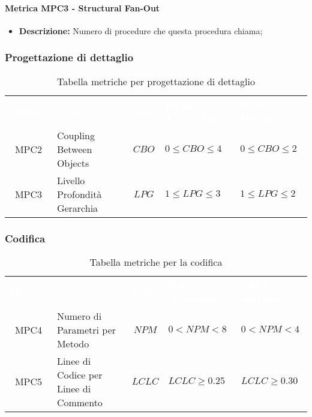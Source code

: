 \paragraph{Metrica MPC3 - Structural Fan-Out}
\begin{itemize}
	\item \textbf{Descrizione:} Numero di procedure che questa procedura chiama;
\end{itemize}
\vspace{0.3cm}
\subsubsection{Progettazione di dettaglio}
\renewcommand{\arraystretch}{1.5}
\begin{longtable}{ c C{4cm} c C{3.5cm} C{3.5cm}}
	\caption{Tabella metriche per progettazione di dettaglio}\\
	\textcolor{white}{\textbf{Metrica}} & \textcolor{white}{\textbf{Nome}} & \textcolor{white}{\textbf{Sigla}} & \textcolor{white}{\textbf{Range Accettabile}} & \textcolor{white}{\textbf{Range Ottimale}}\\
    MPC2 & Coupling Between Objects & $CBO$ & $0 \leq CBO \leq 4$ & $0 \leq CBO \leq 2$ \\
    MPC3 & Livello Profondità Gerarchia & $LPG$ &  $1 \leq LPG \leq 3$ &  $1 \leq LPG \leq 2$ \\
\end{longtable}
\newpage
\subsubsection{Codifica}  
     \renewcommand{\arraystretch}{1.5}
     \begin{longtable}{ c C{4cm} c C{3.5cm} C{3.5cm}}
     	\caption{Tabella metriche per la codifica}\\
     	\textcolor{white}{\textbf{Metrica}} & \textcolor{white}{\textbf{Nome}} & \textcolor{white}{\textbf{Sigla}} & \textcolor{white}{\textbf{Range Accettabile}} & \textcolor{white}{\textbf{Range Ottimale}}\\
		MPC4 & Numero di Parametri per Metodo & $NPM$ & $0 < NPM < 8$ & $ 0 < NPM < 4$ \\
		MPC5 & Linee di Codice per Linee di Commento & $LCLC$ & $LCLC \geq 0.25$ & $LCLC \geq 0.30$ \\
	\end{longtable}
\vspace{0.3cm}
